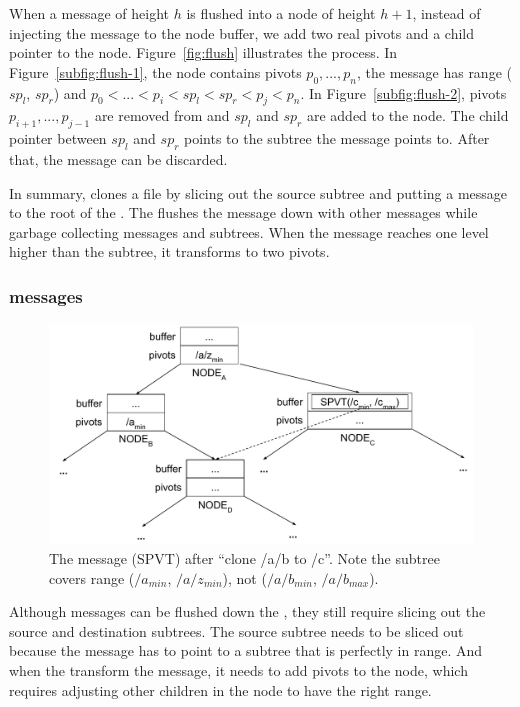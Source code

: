 When a \GOTO message of height $h$ is flushed into a node of height $h+1$,
instead of injecting the message to the node buffer, we add two real pivots and
a child pointer to the node.
Figure~\ref{fig:flush} illustrates the process.
In Figure~\ref{subfig:flush-1}, the node contains pivots $p_0,...,p_n$,
the \GOTO message has range ($sp_l$, $sp_r$) and
$p_0 < ... < p_i < sp_l < sp_r < p_j < p_n$.
In Figure~\ref{subfig:flush-2}, pivots $p_{i+1}, ..., p_{j-1}$ are removed from
and $sp_l$ and $sp_r$ are added to the node.
The child pointer between $sp_l$ and $sp_r$ points to the subtree the \GOTO
message points to.
After that, the \GOTO message can be discarded.

In summary, \betrfs clones a file by slicing out the source subtree and putting
a \GOTO message to the root of the \bet.
The \bet flushes the \GOTO message down with other messages while garbage
collecting messages and subtrees.
When the \GOTO message reaches one level higher than the subtree, it transforms
to two pivots.

\subsubsection{\Spt messages}

\begin{figure}
  \centering
  \includegraphics[width=.9\linewidth]{fig/spvt}
  \caption{The \spt message (SPVT) after ``clone /a/b to /c''. Note the subtree
           covers range ($/a_{min}$, $/a/z_{min}$), not
           ($/a/b_{min}$, $/a/b_{max}$).}
  \label{fig:spvt}
\end{figure}

Although \GOTO messages can be flushed down the \bet, they still require
slicing out the source and destination subtrees.
The source subtree needs to be sliced out because the \GOTO message has to point
to a subtree that is perfectly in range.
And when the \bet transform the \GOTO message, it needs to add pivots to the
node, which requires adjusting other children in the node to have the right
range.


